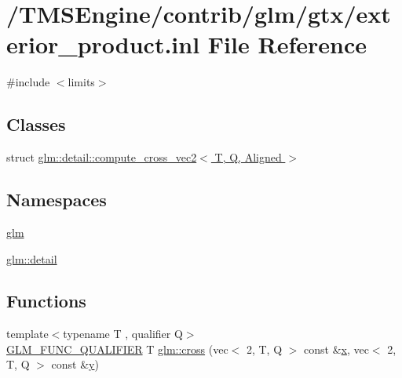 \hypertarget{exterior__product_8inl}{}\section{/\+T\+M\+S\+Engine/contrib/glm/gtx/exterior\+\_\+product.inl File Reference}
\label{exterior__product_8inl}
{\ttfamily \#include $<$limits$>$}\newline
\subsection*{Classes}
\begin{DoxyCompactItemize}
\item 
struct \hyperlink{structglm_1_1detail_1_1compute__cross__vec2}{glm\+::detail\+::compute\+\_\+cross\+\_\+vec2$<$ T, Q, Aligned $>$}
\end{DoxyCompactItemize}
\subsection*{Namespaces}
\begin{DoxyCompactItemize}
\item 
 \hyperlink{namespaceglm}{glm}
\item 
 \hyperlink{namespaceglm_1_1detail}{glm\+::detail}
\end{DoxyCompactItemize}
\subsection*{Functions}
\begin{DoxyCompactItemize}
\item 
{\footnotesize template$<$typename T , qualifier Q$>$ }\\\hyperlink{setup_8hpp_a33fdea6f91c5f834105f7415e2a64407}{G\+L\+M\+\_\+\+F\+U\+N\+C\+\_\+\+Q\+U\+A\+L\+I\+F\+I\+ER} T \hyperlink{group__gtx__exterior__product_gac36e72b934ea6a9dd313772d7e78fa93}{glm\+::cross} (vec$<$ 2, T, Q $>$ const \&\hyperlink{_s_d_l__opengl_8h_ad0e63d0edcdbd3d79554076bf309fd47}{x}, vec$<$ 2, T, Q $>$ const \&\hyperlink{_s_d_l__opengl_8h_a1675d9d7bb68e1657ff028643b4037e3}{y})
\end{DoxyCompactItemize}
